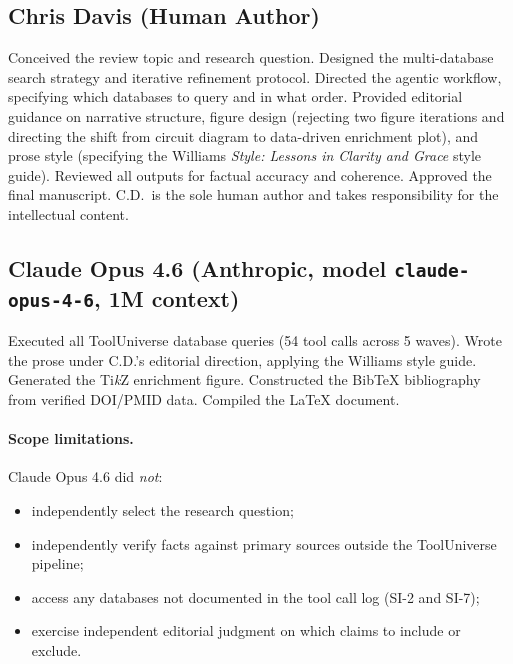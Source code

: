 
\subsection*{Chris Davis (Human Author)}

Conceived the review topic and research question.  Designed the multi-database
search strategy and iterative refinement protocol.  Directed the agentic
workflow, specifying which databases to query and in what order.  Provided
editorial guidance on narrative structure, figure design (rejecting two figure
iterations and directing the shift from circuit diagram to data-driven
enrichment plot), and prose style (specifying the Williams \emph{Style:
Lessons in Clarity and Grace} style guide).  Reviewed all outputs for factual
accuracy and coherence.  Approved the final manuscript.  C.D.\ is the sole
human author and takes responsibility for the intellectual content.

\subsection*{Claude Opus 4.6 (Anthropic, model \texttt{claude-opus-4-6}, 1M context)}

Executed all ToolUniverse database queries (54 tool calls across 5 waves).
Wrote the prose under C.D.'s editorial direction, applying the Williams style
guide.  Generated the Ti\textit{k}Z enrichment figure.  Constructed the
Bib\TeX{} bibliography from verified DOI/PMID data.  Compiled the \LaTeX{}
document.

\paragraph{Scope limitations.}
Claude Opus 4.6 did \emph{not}:
\begin{itemize}[nosep]
  \item independently select the research question;
  \item independently verify facts against primary sources outside the
        ToolUniverse pipeline;
  \item access any databases not documented in the tool call log (SI-2 and
        SI-7);
  \item exercise independent editorial judgment on which claims to include or
        exclude.
\end{itemize}

